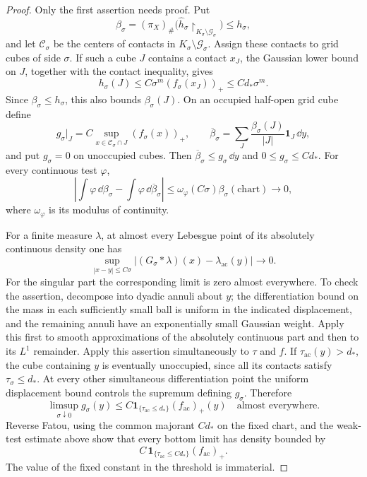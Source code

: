 \begin{proof}
Only the first assertion needs proof. Put
\[
 \beta_\sigma=(\pi_X)_\#
       \bigl(\widehat h_\sigma\!\restriction_{K_\sigma\setminus\mathcal G_\sigma}\bigr)
       \le h_\sigma,
\]
and let \(\mathcal C_\sigma\) be the centers of contacts in
\(K_\sigma\setminus\mathcal G_\sigma\). Assign these contacts to grid
cubes of side \(\sigma\). If such a cube \(J\) contains a contact
\(x_J\), the Gaussian lower bound on \(J\), together with the contact
inequality, gives
\[
 h_\sigma(J)\le C\sigma^m(f_\sigma(x_J))_+
 \le Cd_*\sigma^m.
\]
Since \(\beta_\sigma\le h_\sigma\), this also bounds
\(\beta_\sigma(J)\). On an occupied half-open grid cube define
\[
 g_\sigma|_J=C\sup_{x\in\mathcal C_\sigma\cap J}
                   (f_\sigma(x))_+,
 \qquad
 \overline\beta_\sigma
   =\sum_J\frac{\beta_\sigma(J)}{|J|}\mathbf1_J\,\dd y,
\]
and put \(g_\sigma=0\) on unoccupied cubes. Then
\(\overline\beta_\sigma\le g_\sigma\,\dd y\) and
\(0\le g_\sigma\le Cd_*\). For every continuous test \(\varphi\),
\[
 \left|\int\varphi\,\dd\beta_\sigma
            -\int\varphi\,\dd\overline\beta_\sigma\right|
 \le\omega_\varphi(C\sigma)\beta_\sigma(\text{chart})\longrightarrow0,
\]
where \(\omega_\varphi\) is its modulus of continuity.

For a finite measure \(\lambda\), at almost every Lebesgue point of
its absolutely continuous density one has
\[
 \sup_{|x-y|\le C\sigma}
 \big|(G_\sigma*\lambda)(x)-\lambda_{\mathrm{ac}}(y)\big|
 \longrightarrow0.
\]
For the singular part the corresponding limit is zero almost
everywhere. To check the assertion, decompose into dyadic annuli about
\(y\); the differentiation bound on the mass in each sufficiently
small ball is uniform in the indicated displacement, and the remaining
annuli have an exponentially small Gaussian weight. Apply this first
to smooth approximations of the absolutely continuous part and then
to its \(L^1\) remainder. Apply this assertion simultaneously to
\(\tau\) and \(f\). If \(\tau_{\mathrm{ac}}(y)>d_*\), the cube
containing \(y\) is eventually unoccupied, since all its contacts
satisfy \(\tau_\sigma\le d_*\). At every other simultaneous
differentiation point the uniform displacement bound controls the
supremum defining \(g_\sigma\). Therefore
\[
 \limsup_{\sigma\downarrow0}g_\sigma(y)
 \le C\mathbf1_{\{\tau_{\mathrm{ac}}\le d_*\}}
                         (f_{\mathrm{ac}})_+(y)
 \quad\text{almost everywhere}.
\]
Reverse Fatou, using the common majorant \(Cd_*\) on the fixed
chart, and the weak-test estimate above show that every bottom limit
has density bounded by
\begin{equation}
 C\,\mathbf 1_{\{\tau_{\mathrm{ac}}\le Cd_*\}}
 (f_{\mathrm{ac}})_+.
 \label{ex:bottom-density}
\end{equation}
The value of the fixed constant in the threshold is immaterial.


\end{proof}
